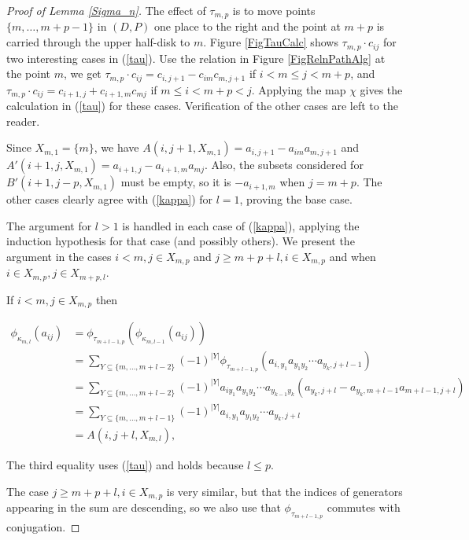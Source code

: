 \documentclass[11pt]{amsart}
\def\t{{\tau}}
\def\k{{\kappa}}
\theoremstyle{definition}
\begin{document}
\begin{proof} [Proof of Lemma \ref{Sigma_n}]
The effect of $\tau_{m,p}$ is to move points $\{m,\ldots,m+p-1\}$ in $(D,P)$ one place to the right and the point at $m+p$ is carried through the upper half-disk to $m$. Figure \ref{FigTauCalc} shows $\t_{m,p}\cdot c_{ij}$ for two interesting cases in (\ref{tau}). Use the relation in Figure \ref{FigRelnPathAlg} at the point $m$, we get $\t_{m,p}\cdot c_{ij} = c_{i,j+1}-c_{im}c_{m,j+1}$ if $i<m\le j<m+p$, and $\t_{m,p}\cdot c_{ij} = c_{i+1,j}+c_{i+1,m}c_{mj}$ if $m\le i<m+p<j$. Applying the map $\chi$ gives the calculation in (\ref{tau}) for these cases. Verification of the other cases are left to the reader.

Since $X_{m,1}=\{m\}$, we have $A(i,j+1,X_{m,1})=a_{i,j+1}-a_{im}a_{m,j+1}$ and $A'(i+1,j,X_{m,1})=a_{i+1,j}-a_{i+1,m}a_{mj}$. Also, the subsets considered for $B'(i+1,j-p,X_{m,1})$ must be empty, so it is $-a_{i+1,m}$ when $j=m+p$. The other cases clearly agree with (\ref{kappa}) for $l=1$, proving the base case.

The argument for $l>1$ is handled in each case of (\ref{kappa}), applying the induction hypothesis for that case (and possibly others).  We present the argument in the cases $i<m,j\in X_{m,p}$ and $j\ge m+p+l,i\in X_{m,p}$ and when $i\in X_{m,p}, j\in X_{m+p,l}$.

If $i<m, j\in X_{m,p}$ then

\begin{align*}
\phi_{\k_{m,l}}(a_{ij}) &= \phi_{\t_{m+l-1,p}}(\phi_{\k_{m,l-1}}(a_{ij}))\\
&= \sum_{{\scriptscriptstyle Y\subseteq \{m,\ldots,m+l-2\}}} (-1)^{|Y|} \phi_{\t_{m+l-1,p}}(a_{i,y_1}a_{y_1y_2}\cdots a_{y_k,j+l-1})\\
&= \sum_{{\scriptscriptstyle Y\subseteq \{m,\ldots,m+l-2\}}} (-1)^{|Y|} a_{iy_1}a_{y_1y_2}\cdots a_{y_{k-1}y_k}(a_{y_k,j+l}-a_{y_k,m+l-1}a_{m+l-1,j+l})\\
&= \sum_{{\scriptscriptstyle Y\subseteq \{m,\ldots,m+l-1\}}} (-1)^{|Y|} a_{i,y_1}a_{y_1y_2}\cdots a_{y_k,j+l}\\
&= A(i,j+l,X_{m,l}),
\end{align*}

The third equality uses (\ref{tau}) and holds because $l\le p$. 

The case $j\ge m+p+l,i\in X_{m,p}$ is very similar, but that the indices of generators appearing in the sum are descending, so we also use that $\phi_{\t_{m+l-1,p}}$ commutes with conjugation.


\end{proof}
\end{document}
